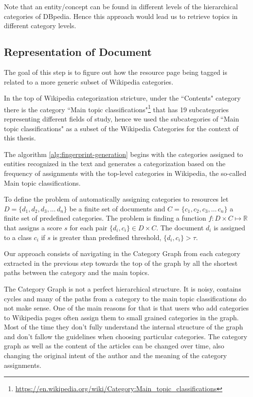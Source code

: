 Note that an entity/concept can be found in different levels of the hierarchical categories of DBpedia. Hence this approach would lead us to retrieve topics in different category levels. 

\subsection{\hspace*{3pt} Representation of Document}
\label{sec:doc-representation}

The goal of this step is to figure out how the resource page being tagged is related to a more generic subset of Wikipedia categories. 

In the top of Wikipedia categorization stricture, under the ``Contents" category there is the category ``Main topic classifications"\footnote{\url{https://en.wikipedia.org/wiki/Category:Main_topic_classifications}} that has 19 subcategories representing different fields of study, hence we used the subcategories of ``Main topic classifications" as a subset of the Wikipedia Categories for the context of this thesis. 

The algorithm \ref{alg:fingerprint-generation} begins with the categories assigned to entities recognized in the text and generates a categorization based on the frequency of assignments with the top-level categories in Wikipedia, the so-called Main topic classifications.

To define the problem of automatically assigning categories to resources let $D = \{d_1,d_2,d_3,\ldots\,d_n\}$ be a finite set of documents and $C = \{c_1,c_2,c_3,\ldots\,c_n\}$ a finite set of predefined categories.
The problem is finding a function $f: D \times C \mapsto \mathbb{R}$ that assigns a score $s$ for each pair 
$\{d_i, c_i\} \in  D \times C $. The document $d_i$ is assigned to a class $c_i$ if $s$ is greater than predefined threshold, $\{d_i, c_i\} > \tau$. 


Our approach consists of navigating in the Category Graph from each category extracted in the previous step towards the top of the graph by all the shortest paths between the category and the main topics.  

The Category Graph is not a perfect hierarchical structure. It is noisy, contains cycles and many of the paths from a category to the main topic classifications do not make sense. One of the main reasons for that is that users who add categories to Wikipedia pages often assign them to small grained categories in the graph. Most of the time they don't fully understand the internal structure of the graph and don't fallow the guidelines when choosing particular categories. The category graph as well as the content of the articles can be changed over time, also changing the original intent of the author and the meaning of the category assignments.

